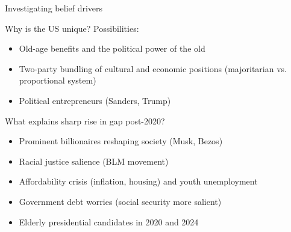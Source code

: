 \documentclass{beamer}
\begin{document}
\begin{frame}{Investigating belief drivers}

Why is the US unique? Possibilities:
\begin{itemize}
    \item Old-age benefits and the political power of the old
    \item Two-party bundling of cultural and economic positions (majoritarian vs. proportional system)
    \item Political entrepreneurs (Sanders, Trump)
\end{itemize}
What explains sharp rise in gap post-2020?
\begin{itemize}
    \item Prominent billionaires reshaping society (Musk, Bezos)
    \item Racial justice salience (BLM movement)
    \item Affordability crisis (inflation, housing) and youth unemployment
    \item Government debt worries (social security more salient)
    \item Elderly presidential candidates in 2020 and 2024
\end{itemize}

\end{frame}
\end{document}
